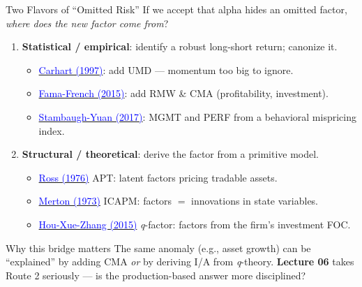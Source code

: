 \documentclass{beamer}
\begin{document}
\begin{frame}{Two Flavors of ``Omitted Risk''}
	\small
	If we accept that alpha hides an omitted factor, \textit{where does the new factor come from}?
	\begin{enumerate}\setlength\itemsep{2pt}
		\item \textbf{Statistical / empirical}: identify a robust long-short return; canonize it.
		\begin{itemize}\setlength\itemsep{1pt}
			\item \href{https://doi.org/10.1111/j.1540-6261.1997.tb03808.x}{\textcolor{blue}{Carhart (1997)}}: add UMD --- momentum too big to ignore.
			\item \href{https://doi.org/10.1016/j.jfineco.2014.10.010}{\textcolor{blue}{Fama-French (2015)}}: add RMW \& CMA (profitability, investment).
			\item \href{https://doi.org/10.1093/rfs/hhw107}{\textcolor{blue}{Stambaugh-Yuan (2017)}}: MGMT and PERF from a behavioral mispricing index.
		\end{itemize}
		\item \textbf{Structural / theoretical}: derive the factor from a primitive model.
		\begin{itemize}\setlength\itemsep{1pt}
			\item \href{https://doi.org/10.1016/0022-0531(76)90046-6}{\textcolor{blue}{Ross (1976)}} APT: latent factors pricing tradable assets.
			\item \href{https://doi.org/10.2307/1913811}{\textcolor{blue}{Merton (1973)}} ICAPM: factors $=$ innovations in state variables.
			\item \href{https://doi.org/10.1093/rfs/hhu068}{\textcolor{blue}{Hou-Xue-Zhang (2015)}} \textit{q}-factor: factors from the firm's investment FOC.
		\end{itemize}
	\end{enumerate}
	\begin{block}{Why this bridge matters}
		The same anomaly (e.g., asset growth) can be ``explained'' by adding CMA \textit{or} by deriving I/A from \textit{q}-theory. \textbf{Lecture 06} takes Route 2 seriously --- is the production-based answer more disciplined?
	\end{block}
\end{frame}
\end{document}
